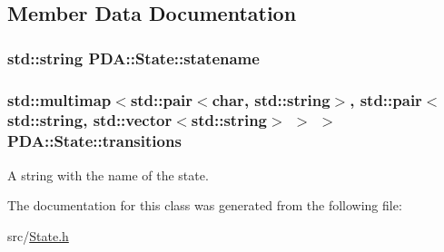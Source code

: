 \subsection{\-Member \-Data \-Documentation}
\hypertarget{classPDA_1_1State_afbfeb988281f28afbb9a0718e8e4eb67}{
\subsubsection[{statename}]{\setlength{\rightskip}{0pt plus 5cm}std\-::string {\bf \-P\-D\-A\-::\-State\-::statename}}}\label{d7/d1f/classPDA_1_1State_afbfeb988281f28afbb9a0718e8e4eb67}
\hypertarget{classPDA_1_1State_abbe5635de165a5a202ba1eb31ee61af1}{
\subsubsection[{transitions}]{\setlength{\rightskip}{0pt plus 5cm}std\-::multimap$<$std\-::pair$<$char, std\-::string$>$, std\-::pair$<$std\-::string, std\-::vector$<$std\-::string$>$ $>$ $>$ {\bf \-P\-D\-A\-::\-State\-::transitions}}}\label{d7/d1f/classPDA_1_1State_abbe5635de165a5a202ba1eb31ee61af1}


\-A string with the name of the state. 



\-The documentation for this class was generated from the following file\-:\begin{DoxyCompactItemize}
\item 
src/\hyperlink{State_8h}{\-State.\-h}\end{DoxyCompactItemize}
